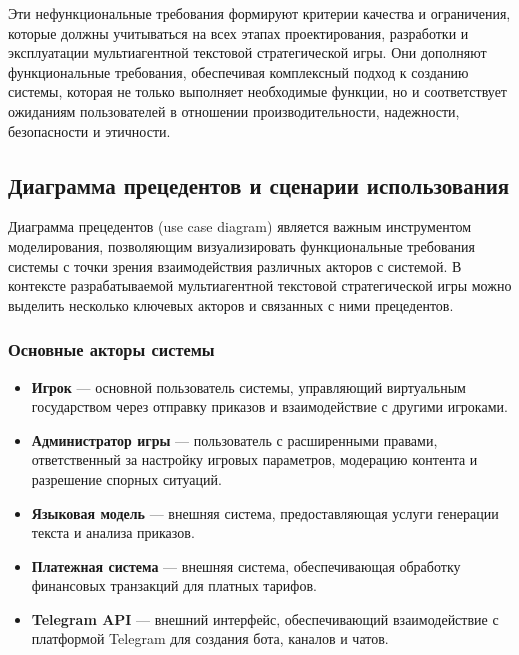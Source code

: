 Эти нефункциональные требования формируют критерии качества и ограничения, которые должны учитываться на всех этапах проектирования, разработки и эксплуатации мультиагентной текстовой стратегической игры. Они дополняют функциональные требования, обеспечивая комплексный подход к созданию системы, которая не только выполняет необходимые функции, но и соответствует ожиданиям пользователей в отношении производительности, надежности, безопасности и этичности.

\subsection{Диаграмма прецедентов и сценарии использования}

Диаграмма прецедентов (use case diagram) является важным инструментом моделирования, позволяющим визуализировать функциональные требования системы с точки зрения взаимодействия различных акторов с системой. В контексте разрабатываемой мультиагентной текстовой стратегической игры можно выделить несколько ключевых акторов и связанных с ними прецедентов.

\subsubsection{Основные акторы системы}

\begin{itemize}
    \item \textbf{Игрок} — основной пользователь системы, управляющий виртуальным государством через отправку приказов и взаимодействие с другими игроками.

    \item \textbf{Администратор игры} — пользователь с расширенными правами, ответственный за настройку игровых параметров, модерацию контента и разрешение спорных ситуаций.

    \item \textbf{Языковая модель} — внешняя система, предоставляющая услуги генерации текста и анализа приказов.

    \item \textbf{Платежная система} — внешняя система, обеспечивающая обработку финансовых транзакций для платных тарифов.

    \item \textbf{Telegram API} — внешний интерфейс, обеспечивающий взаимодействие с платформой Telegram для создания бота, каналов и чатов.
\end{itemize}

